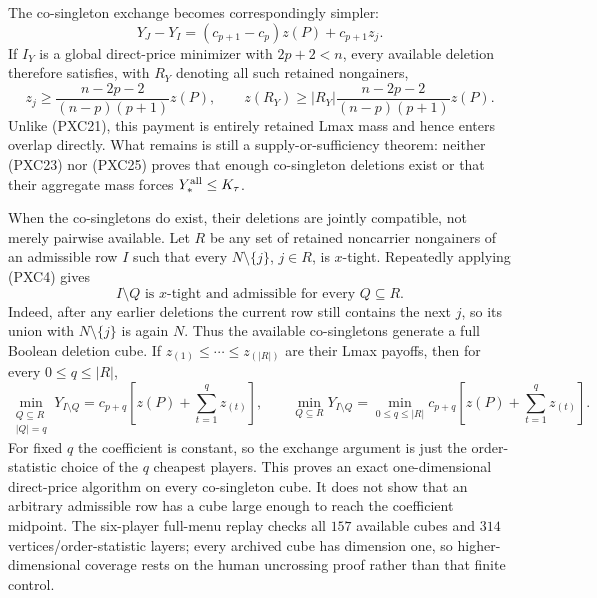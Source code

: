 \documentclass[11pt]{article}
\begin{document}
The co-singleton exchange becomes correspondingly simpler:
\[
 Y_J-Y_I=(c_{p+1}-c_p)z(P)+c_{p+1}z_j.             \tag{PXC24}
\]
If $I_Y$ is a global direct-price minimizer with $2p+2<n$, every available
deletion therefore satisfies, with
$R_Y$ denoting all such retained nongainers,
\[
 z_j\ge\frac{n-2p-2}{(n-p)(p+1)}z(P),\qquad
 z(R_Y)\ge |R_Y|\frac{n-2p-2}{(n-p)(p+1)}z(P).     \tag{PXC25}
\]
Unlike (PXC21), this payment is entirely retained Lmax mass and hence enters
overlap directly.  What remains is still a supply-or-sufficiency theorem:
neither (PXC23) nor (PXC25) proves that enough co-singleton deletions exist or
that their aggregate mass forces $Y_*^{\rm all}\le K_\tau$.

When the co-singletons do exist, their deletions are jointly compatible, not
merely pairwise available.  Let $R$ be any set of retained noncarrier
nongainers of an admissible row $I$ such that every
$N\setminus\{j\}$, $j\in R$, is $x$-tight.  Repeatedly applying (PXC4) gives
\[
 I\setminus Q\text{ is $x$-tight and admissible for every }Q\subseteq R.
                                                               \tag{PXC26}
\]
Indeed, after any earlier deletions the current row still contains the next
$j$, so its union with $N\setminus\{j\}$ is again $N$.  Thus the available
co-singletons generate a full Boolean deletion cube.  If
$z_{(1)}\le\cdots\le z_{(|R|)}$ are their Lmax payoffs, then for every
$0\le q\le|R|$,
\[
 \min_{\substack{Q\subseteq R\\|Q|=q}}Y_{I\setminus Q}
  =c_{p+q}\left[z(P)+\sum_{t=1}^qz_{(t)}\right],
 \qquad
 \min_{Q\subseteq R}Y_{I\setminus Q}
  =\min_{0\le q\le|R|}
    c_{p+q}\left[z(P)+\sum_{t=1}^qz_{(t)}\right].   \tag{PXC27}
\]
For fixed $q$ the coefficient is constant, so the exchange argument is just
the order-statistic choice of the $q$ cheapest players.  This proves an exact
one-dimensional direct-price algorithm on every co-singleton cube.  It does
not show that an arbitrary admissible row has a cube large enough to reach
the coefficient midpoint.  The six-player full-menu replay checks all $157$
available cubes and $314$ vertices/order-statistic layers; every archived
cube has dimension one, so higher-dimensional coverage rests on the human
uncrossing proof rather than that finite control.
\end{document}
